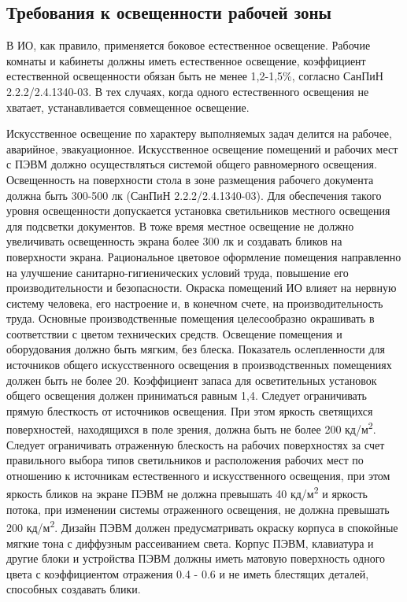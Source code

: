 \documentclass[utf8,usehyperref,12pt]{G7-32}
\begin{document}
\subsection{Требования к освещенности рабочей зоны}
В ИО, как правило, применяется боковое естественное освещение. Рабочие комнаты и кабинеты должны иметь естественное освещение, коэффициент естественной освещенности обязан быть не менее 1,2-1,5\%, согласно СанПиН 2.2.2/2.4.1340-03. В тех случаях, когда одного естественного освещения не хватает, устанавливается совмещенное освещение.

Искусственное освещение по характеру выполняемых задач делится на рабочее, аварийное, эвакуационное. 
Искусственное освещение помещений и рабочих мест с ПЭВМ должно осуществляться системой общего равномерного освещения. 
Освещенность на поверхности стола в зоне размещения рабочего документа должна быть 300-500 лк (СанПиН 2.2.2/2.4.1340-03). Для обеспечения такого уровня освещенности допускается установка светильников местного освещения для подсветки документов. В тоже время местное освещение не должно увеличивать освещенность экрана более 300 лк и создавать бликов на поверхности экрана. 
Рациональное цветовое оформление помещения направленно на улучшение санитарно-гигиенических условий труда, повышение его производительности и безопасности. Окраска помещений ИО влияет на нервную систему человека, его настроение и, в конечном счете, на производительность труда. Основные производственные помещения целесообразно окрашивать в соответствии с цветом технических средств. Освещение помещения и оборудования должно быть мягким, без блеска. 
Показатель ослепленности для источников общего искусственного освещения в производственных помещениях должен быть не более 20. Коэффициент запаса для осветительных установок общего освещения должен приниматься равным 1,4. Следует ограничивать прямую блесткость от источников освещения. При этом яркость светящихся поверхностей, находящихся в поле зрения, должна быть не более 200 кд/м\textsuperscript{2}. 
Следует ограничивать отраженную блескость на рабочих поверхностях за счет правильного выбора типов светильников и расположения рабочих мест по отношению к источникам естественного и искусственного освещения, при этом яркость бликов 
на экране ПЭВМ не должна превышать 40 кд/м\textsuperscript{2} и яркость потока, при изменении системы отраженного освещения, не должна превышать 200 кд/м\textsuperscript{2}.
Дизайн ПЭВМ должен предусматривать окраску корпуса в спокойные мягкие тона с диффузным рассеиванием света. Корпус ПЭВМ, клавиатура и другие блоки и устройства ПЭВМ должны иметь матовую поверхность одного цвета с коэффициентом отражения 0.4 - 0.6 и не иметь блестящих деталей, способных создавать блики.
\end{document}
